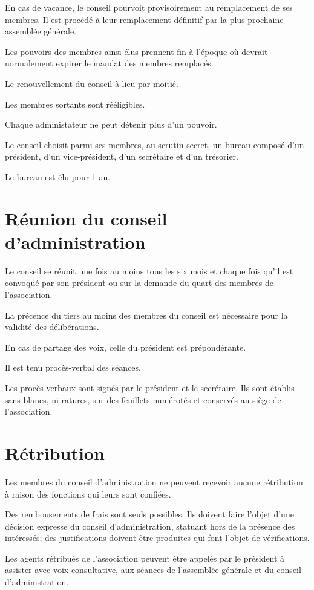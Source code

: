 \documentclass[a4paper,defaultorg]{organisation-contract}
\begin{document}
En cas de vacance, le conseil pourvoit provisoirement au remplacement de ses
membres. Il est procédé à leur remplacement définitif par la plus prochaine
assemblée générale.

Les pouvoirs des membres ainsi élus prennent fin à l'époque où devrait
normalement expirer le mandat des membres remplacés.

Le renouvellement du conseil à lieu par moitié.

Les membres sortants sont rééligibles.

Chaque administateur ne peut détenir plus d'un pouvoir.

Le conseil choisit parmi ses membres, au scrutin secret, un bureau composé d'un
président, d'un vice-président, d'un secrétaire et d'un trésorier. 

Le bureau est élu pour 1 an.

\section{Réunion du conseil d'administration}
Le conseil se réunit une fois au moins tous les six mois et chaque fois qu'il
est convoqué par son président ou sur la demande du quart des membres de
l'association.

La précence du tiers au moins des membres du conseil est nécessaire pour la
validité des délibérations.

En cas de partage des voix, celle du président est prépondérante.

Il est tenu procès-verbal des séances.

Les procès-verbaux sont signés par le président et le secrétaire. Ils sont
établis sans blancs, ni ratures, sur des feuillets numérotés et conservés au
siège de l'association.

\section{Rétribution}
Les membres du conseil d'administration ne peuvent recevoir aucune rétribution
à raison des fonctions qui leurs sont confiées.

Des rembousements de frais sont seuls possibles. Ils doivent faire l'objet d'une
décision expresse du conseil d'administration, statuant hors de la présence des
intéressés; des justifications doivent être produites qui font l'objet de
vérifications.

Les agents rétribués de l'association peuvent être appelés par le président à
assister avec voix consultative, aux séances de l'assemblée générale et du
conseil d'administration.
\end{document}
